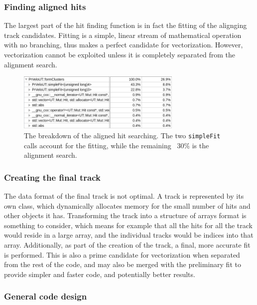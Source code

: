 \documentclass[12pt]{article}
\newcommand{\code}[1]{\texttt{#1}}
\begin{document}
\subsubsection{Finding aligned hits}

The largest part of the hit finding function is in fact the fitting of the alignging track candidates. Fitting is a simple, linear stream of mathematical operation with no branching, thus makes a perfect candidate for vectorization. However, vectorization cannot be exploited unless it is completely separated from the alignment search.

\begin{figure}[H]
	\begin{center}
		\includegraphics[width=0.7\textwidth]{velout_hotspots_orig_formclusters}
	\end{center}
	\caption{The breakdown of the aligned hit searching. The two \code{simpleFit} calls account for the fitting, while the remaining ~30\% is the alignment search.}
	\label{fig_velout_hotspots_orig_formclusters}
\end{figure}


\subsubsection{Creating the final track}

The data format of the final track is not optimal. A track is represented by its own class, which dynamically allocates memory for the small number of hits and other objects it has. Transforming the track into a structure of arrays format is something to consider, which means for example that all the hits for all the track would reside in a large array, and the individual tracks would be indices into that array.
Additionally, as part of the creation of the track, a final, more accurate fit is performed. This is also a prime candidate for vectorization when separated from the rest of the code, and may also be merged with the preliminary fit to provide simpler and faster code, and potentially better results.


\subsubsection{General code design}
\end{document}
